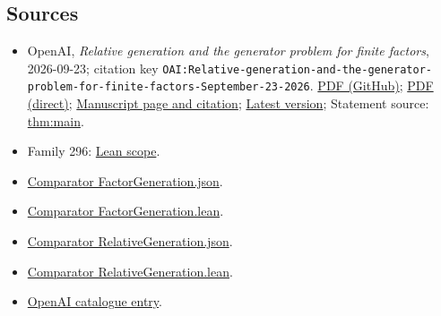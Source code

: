 \documentclass[11pt]{article}
\begin{document}
\subsection{Sources}
\begin{itemize}
\item OpenAI, \emph{Relative generation and the generator problem for finite factors}, 2026-09-23; citation key \texttt{OAI:Relative-generation-and-the-generator-problem-for-finite-factors-September-23-2026}. \href{https://github.com/openai/math/blob/adc7f1241b42e322a6451854ab7e4b4c146bf78a/preprints/Relative-generation-and-the-generator-problem-for-finite-factors-September-23-2026/paper.pdf}{PDF (GitHub)}; \href{https://github.com/openai/math/raw/adc7f1241b42e322a6451854ab7e4b4c146bf78a/preprints/Relative-generation-and-the-generator-problem-for-finite-factors-September-23-2026/paper.pdf}{PDF (direct)}; \href{https://github.com/openai/math/blob/adc7f1241b42e322a6451854ab7e4b4c146bf78a/preprints/Relative-generation-and-the-generator-problem-for-finite-factors-September-23-2026/README.md}{Manuscript page and citation}; \href{https://github.com/openai/math/blob/main/preprints/Relative-generation-and-the-generator-problem-for-finite-factors-September-23-2026/paper.pdf}{Latest version}; Statement source: \href{https://github.com/openai/math/blob/adc7f1241b42e322a6451854ab7e4b4c146bf78a/preprints/Relative-generation-and-the-generator-problem-for-finite-factors-September-23-2026/build/sections/introduction.tex\#L29}{thm:main}.
\item Family 296: \href{https://github.com/openai/math/blob/adc7f1241b42e322a6451854ab7e4b4c146bf78a/lean/docs/296.md}{Lean scope}.
\item \href{https://github.com/openai/math/blob/adc7f1241b42e322a6451854ab7e4b4c146bf78a/lean/ComparatorChallenges/FactorGeneration.json}{Comparator FactorGeneration.json}.
\item \href{https://github.com/openai/math/blob/adc7f1241b42e322a6451854ab7e4b4c146bf78a/lean/ComparatorChallenges/FactorGeneration.lean}{Comparator FactorGeneration.lean}.
\item \href{https://github.com/openai/math/blob/adc7f1241b42e322a6451854ab7e4b4c146bf78a/lean/ComparatorChallenges/RelativeGeneration.json}{Comparator RelativeGeneration.json}.
\item \href{https://github.com/openai/math/blob/adc7f1241b42e322a6451854ab7e4b4c146bf78a/lean/ComparatorChallenges/RelativeGeneration.lean}{Comparator RelativeGeneration.lean}.
\item \href{https://github.com/openai/math/blob/adc7f1241b42e322a6451854ab7e4b4c146bf78a/CONTENTS.md}{OpenAI catalogue entry}.
\end{itemize}
\end{document}
